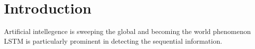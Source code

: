 \section{Introduction}
Artificial intellegence is sweeping the global and becoming the world phenomenon 
\\
LSTM is particularly prominent in detecting the sequential information. 